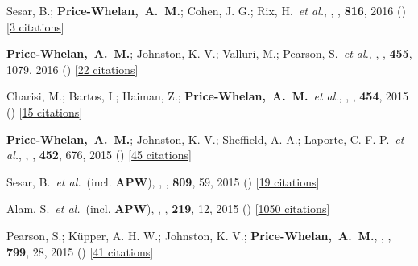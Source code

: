 \item[{\color{deemph}\scriptsize21}]Sesar, B.; \textbf{Price-Whelan,~A.~M.}; Cohen, J. G.; Rix, H.~\textit{et al.}, , \apj, \textbf{816}, 2016 () [\href{http://adsabs.harvard.edu/abs/2016ApJ...816L...4S}{3 citations}]

\item[{\color{deemph}\scriptsize20}]\textbf{Price-Whelan,~A.~M.}; Johnston, K. V.; Valluri, M.; Pearson, S.~\textit{et al.}, , \mnras, \textbf{455}, 1079, 2016 () [\href{http://adsabs.harvard.edu/abs/2016MNRAS.455.1079P}{22 citations}]

\item[{\color{deemph}\scriptsize19}]Charisi, M.; Bartos, I.; Haiman, Z.; \textbf{Price-Whelan,~A.~M.}~\textit{et al.}, , \mnras, \textbf{454}, 2015 () [\href{http://adsabs.harvard.edu/abs/2015MNRAS.454L..21C}{15 citations}]

\item[{\color{deemph}\scriptsize18}]\textbf{Price-Whelan,~A.~M.}; Johnston, K. V.; Sheffield, A. A.; Laporte, C. F. P.~\textit{et al.}, , \mnras, \textbf{452}, 676, 2015 () [\href{http://adsabs.harvard.edu/abs/2015MNRAS.452..676P}{45 citations}]

\item[{\color{deemph}\scriptsize17}]Sesar, B.~\textit{et al.}~(incl. \textbf{APW}), , \apj, \textbf{809}, 59, 2015 () [\href{http://adsabs.harvard.edu/abs/2015ApJ...809...59S}{19 citations}]

\item[{\color{deemph}\scriptsize16}]Alam, S.~\textit{et al.}~(incl. \textbf{APW}), , \apjs, \textbf{219}, 12, 2015 () [\href{http://adsabs.harvard.edu/abs/2015ApJS..219...12A}{1050 citations}]

\item[{\color{deemph}\scriptsize15}]Pearson, S.; K{\"u}pper, A. H. W.; Johnston, K. V.; \textbf{Price-Whelan,~A.~M.}, , \apj, \textbf{799}, 28, 2015 () [\href{http://adsabs.harvard.edu/abs/2015ApJ...799...28P}{41 citations}]

